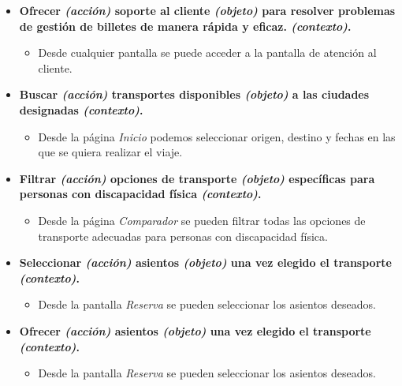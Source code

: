 \begin{itemize}
    \item \textbf{Ofrecer \textit{(acción)} soporte al cliente \textit{(objeto)} para resolver problemas de gestión de
        billetes de manera rápida y eficaz. \textit{(contexto)}.}
        \begin{itemize}
            \item Desde cualquier pantalla se puede acceder a la pantalla de atención al cliente.
        \end{itemize}

    \item \textbf{Buscar \textit{(acción)} transportes disponibles \textit{(objeto)} a las ciudades designadas \textit{(contexto)}.} 
        \begin{itemize}
            \item Desde la página \textit{Inicio} podemos seleccionar origen, destino y fechas en las que se quiera
                realizar el viaje.
        \end{itemize}

    \item \textbf{Filtrar \textit{(acción)} opciones de transporte \textit{(objeto)} específicas para personas con discapacidad
        física \textit{(contexto)}.}
        \begin{itemize}
            \item Desde la página \textit{Comparador} se pueden filtrar todas las opciones de transporte adecuadas para personas con
                discapacidad física.
        \end{itemize}

    \item \textbf{Seleccionar \textit{(acción)} asientos \textit{(objeto)} una vez elegido el transporte \textit{(contexto)}.}
        \begin{itemize}
            \item Desde la pantalla \textit{Reserva} se pueden seleccionar los asientos deseados.
        \end{itemize}

    \item \textbf{Ofrecer \textit{(acción)} asientos \textit{(objeto)} una vez elegido el transporte \textit{(contexto)}.}
        \begin{itemize}
            \item Desde la pantalla \textit{Reserva} se pueden seleccionar los asientos deseados.
        \end{itemize}
\end{itemize}


